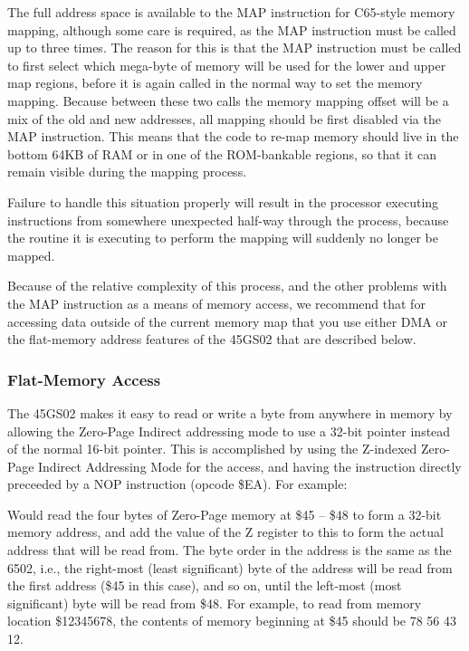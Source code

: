 The full address space is available to the MAP instruction for C65-style memory
mapping, although some care is required, as the MAP instruction must be called up to three times.
The reason for this is that the MAP instruction must be called to first select which mega-byte of
memory will be used for the lower and upper map regions, before it is again called in the normal
way to set the memory mapping.  Because between these two calls the memory mapping offset will be
a mix of the old and new addresses, all mapping should be first disabled via the MAP instruction.
This means that the code to re-map memory should live in the bottom 64KB of RAM or in one of the
ROM-bankable regions, so that it can remain visible during the mapping process.

Failure to handle this situation properly will result in the processor executing instructions
from somewhere unexpected half-way through the process, because the routine it is executing
to perform the mapping will suddenly no longer be mapped.

Because of the relative complexity of this process, and the other problems with the MAP instruction
as a means of memory access, we recommend that for accessing data outside of the current memory
map that you use either DMA or the flat-memory address features of the 45GS02 that are described below.

\subsubsection{Flat-Memory Access}

The 45GS02 makes it easy to read or write a byte from anywhere in memory by allowing the Zero-Page Indirect
addressing mode to use a 32-bit pointer instead of the normal 16-bit pointer.  This is accomplished by
using the Z-indexed Zero-Page Indirect Addressing Mode for the access, and having the instruction directly
preceeded by a NOP instruction (opcode \$EA).  For example:


Would read the four bytes of Zero-Page memory at \$45 -- \$48 to form a 32-bit memory address, and add the value of the
Z register to this to form the actual address that will be read from.  The byte order in the address is the same as
the 6502, i.e., the right-most (least significant) byte of the address will be read from the first address (\$45 in this case),
and so on, until the left-most (most significant) byte will be read from \$48.  For example, to read from memory location
\$12345678, the contents of memory beginning at \$45 should be 78 56 43 12.


